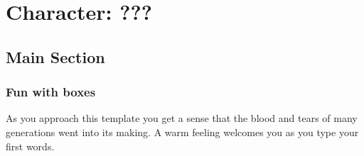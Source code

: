 \documentclass[10pt,twoside,twocolumn,openany]{book}
\begin{document}
\selectfont %


\chapter{Character: ???}


{\vspace{-3em}}

\section{Main Section}
\lipsum[1] %

\newpage

\lipsum[1] %

\subsection{Fun with boxes}

\begin{quotebox}
	As you approach this template you get a sense that the blood and tears of many generations went into its making. A warm feeling welcomes you as you type your first words.
\end{quotebox}
\end{document}
